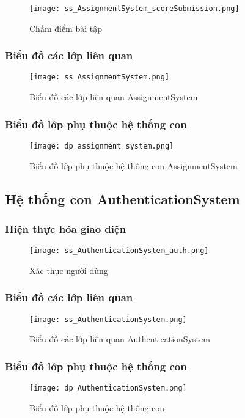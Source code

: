 \documentclass[./../main.tex]{subfiles}
\begin{document}
\begin{figure}[H]
    \centering
    \texttt{[image: ss\_AssignmentSystem\_scoreSubmission.png]}
    \caption{Chấm điểm bài tập}
    \label{ss_as_ss}
\end{figure}
\subsubsection{Biểu đồ các lớp liên quan}
\begin{figure}[H]
    \centering
    \texttt{[image: ss\_AssignmentSystem.png]}
    \caption{Biểu đồ các lớp liên quan AssignmentSystem}
    \label{ss_as}
\end{figure}
\subsubsection{Biểu đồ lớp phụ thuộc hệ thống con}
\begin{figure}[H]
    \centering
    \texttt{[image: dp\_assignment\_system.png]}
    \caption{Biểu đồ lớp phụ thuộc hệ thống con AssignmentSystem}
    \label{dp_as}
\end{figure}

\subsection{Hệ thống con AuthenticationSystem}
\subsubsection{Hiện thực hóa giao diện}
\begin{figure}[H]
    \centering
    \texttt{[image: ss\_AuthenticationSystem\_auth.png]}
    \caption{Xác thực người dùng}
    \label{ss_aus_a}
\end{figure}
\subsubsection{Biểu đồ các lớp liên quan}
\begin{figure}[H]
    \centering
    \texttt{[image: ss\_AuthenticationSystem.png]}
    \caption{Biểu đồ các lớp liên quan AuthenticationSystem}
    \label{ss_aus}
\end{figure}
\subsubsection{Biểu đồ lớp phụ thuộc hệ thống con}
\begin{figure}[H]
    \centering
    \texttt{[image: dp\_AuthenticationSystem.png]}
    \caption{Biểu đồ lớp phụ thuộc hệ thống con}
    \label{dp_aus}
\end{figure}
\end{document}
